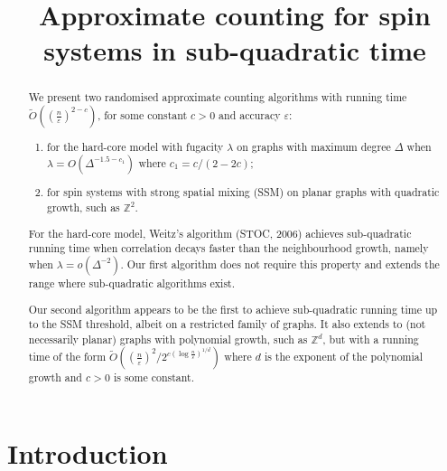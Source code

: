 \documentclass{theoretics}
\title{Approximate counting for spin systems in sub-quadratic time}
\newcommand{\eps}{\varepsilon}
\begin{document}
\maketitle

\begin{abstract}
  We present two randomised approximate counting algorithms with running time $\widetilde{O}\left(\left(\frac{n}{\eps}\right)^{2-c}\right)$, for some constant $c>0$ and accuracy $\eps$:
  \begin{enumerate}
    \item for the hard-core model with fugacity $\lambda$ on graphs with maximum degree $\Delta$ when $\lambda=O(\Delta^{-1.5-c_1})$ where $c_1=c/(2-2c)$;
    \item for spin systems with strong spatial mixing (SSM) on planar graphs with quadratic growth, such as $\mathbb{Z}^2$.
  \end{enumerate}

  For the hard-core model, Weitz's algorithm (STOC, 2006) achieves sub-quadratic running time when correlation decays faster than the neighbourhood growth, namely when $\lambda = o(\Delta^{-2})$.
  Our first algorithm does not require this property and extends the range where sub-quadratic algorithms exist.

  Our second algorithm appears to be the first to achieve sub-quadratic running time up to the SSM threshold, albeit on a restricted family of graphs.
  It also extends to (not necessarily planar) graphs with polynomial growth, such as $\mathbb{Z}^d$,
  but with a running time of the form $\widetilde{O}\left(\left(\frac{n}{\eps}\right)^{2}/2^{c(\log \frac{n}{\eps})^{1/d}}\right)$ where $d$ is the exponent of the polynomial growth and $c>0$ is some constant.
\end{abstract}

\section{Introduction}
\end{document}
